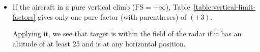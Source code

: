 {\begin{itemize}
Applying them, we see that the target is within the field of the radar if it either has an altitude of 20 or more and is within the  horizontal arc or if it has an altitude of at least 45 and is at any horizontal position.

\item
If the aircraft in a pure vertical climb ($\mbox{FS} = +\infty$), Table~\ref{table:vertical-limit-factors} gives only one pure factor (with parentheses) of $(+3)$.

Applying it, we see that target is within the field of the radar if it has an altitude of at least 25 and is at any horizontal position.

\end{itemize}
}

